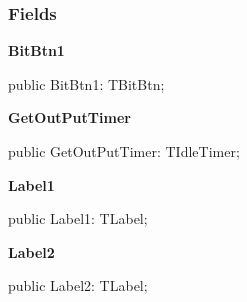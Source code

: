 \documentclass{report}
\newif\ifpdf
\begin{document}
\subsubsection*{\large{\textbf{Fields}}\normalsize\hspace{1ex}\hfill}
\begin{list}{}{
\setlength{\itemindent}{0cm}
\setlength{\listparindent}{0cm}
\setlength{\leftmargin}{\evensidemargin}
\addtolength{\leftmargin}{\tmplength}
\settowidth{\labelsep}{X}
\addtolength{\leftmargin}{\labelsep}
\setlength{\labelwidth}{\tmplength}
}
\label{uninstall.TRMForm-BitBtn1}
\item[\textbf{BitBtn1}\hfill]
\ifpdf
\begin{flushleft}
\fi
\begin{ttfamily}
public BitBtn1: TBitBtn;\end{ttfamily}

\ifpdf
\end{flushleft}
\fi


\par  \label{uninstall.TRMForm-GetOutPutTimer}
\item[\textbf{GetOutPutTimer}\hfill]
\ifpdf
\begin{flushleft}
\fi
\begin{ttfamily}
public GetOutPutTimer: TIdleTimer;\end{ttfamily}

\ifpdf
\end{flushleft}
\fi


\par  \label{uninstall.TRMForm-Label1}
\item[\textbf{Label1}\hfill]
\ifpdf
\begin{flushleft}
\fi
\begin{ttfamily}
public Label1: TLabel;\end{ttfamily}

\ifpdf
\end{flushleft}
\fi


\par  \label{uninstall.TRMForm-Label2}
\item[\textbf{Label2}\hfill]
\ifpdf
\begin{flushleft}
\fi
\begin{ttfamily}
public Label2: TLabel;\end{ttfamily}

\ifpdf
\end{flushleft}
\fi



\end{list}
\end{document}
